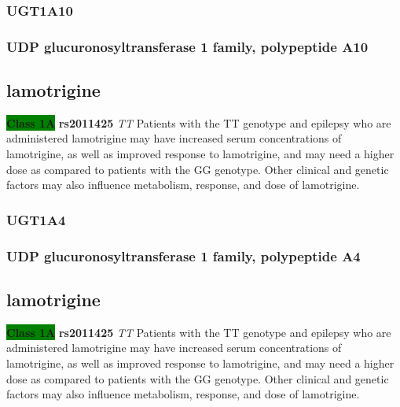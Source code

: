 \documentclass{book}
\begin{document}
\subsubsection{ UGT1A10 }
\subsubsection{ UDP glucuronosyltransferase 1 family, polypeptide A10 }

\subsection{ lamotrigine }


\begin{center}



\textbf{\colorbox{green} {Class 1A}} \textbf{ rs2011425 } \textit{ TT }
Patients with the TT genotype and epilepsy who are administered lamotrigine may have increased serum concentrations of lamotrigine, as well as improved response to lamotrigine, and may need a higher dose as compared to patients with the GG genotype. Other clinical and genetic factors may also influence metabolism, response, and dose of lamotrigine.  

\end{center}






\subsubsection{ UGT1A4 }
\subsubsection{ UDP glucuronosyltransferase 1 family, polypeptide A4 }

\subsection{ lamotrigine }


\begin{center}



\textbf{\colorbox{green} {Class 1A}} \textbf{ rs2011425 } \textit{ TT }
Patients with the TT genotype and epilepsy who are administered lamotrigine may have increased serum concentrations of lamotrigine, as well as improved response to lamotrigine, and may need a higher dose as compared to patients with the GG genotype. Other clinical and genetic factors may also influence metabolism, response, and dose of lamotrigine.  

\end{center}
\end{document}
